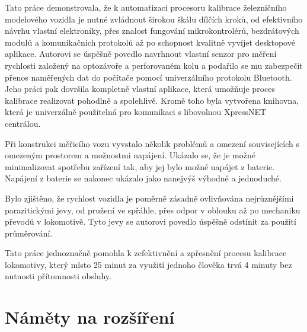 Tato práce demonstrovala, že k automatizaci procesoru kalibrace železničního
modelového vozidla je nutné zvládnout širokou škálu dílčích kroků, od
efektivního návrhu vlastní elektroniky, přes znalost fungování mikrokontrolérů,
bezdrátových modulů a komunikačních protokolů až po schopnost kvalitně vyvíjet
desktopové aplikace. Autorovi se úspěšně povedlo navrhnout vlastní senzor pro
měření rychlosti založený na optozávoře a perforovaném kolu a podařilo se mu
zabezpečit přenos naměřených dat do počítače pomocí univerzálního protokolu
Bluetooth. Jeho práci pak dovršila kompletně vlastní aplikace, která umožňuje
proces kalibrace realizovat pohodlně a spolehlivě. Kromě toho byla vytvořena
knihovna, která je univerzálně použitelná pro komunikaci s libovolnou XpressNET
centrálou.

Při konstrukci měřicího vozu vyvstalo několik problémů a omezení souvisejících
s omezeným prostorem a možnostmi napájení. Ukázalo se, že je možné minimalizovat
spotřebu zařízení tak, aby jej bylo možné napájet z baterie. Napájení z baterie
se nakonec ukázalo jako nanejvýš výhodné a jednoduché.

Bylo zjištěno, že rychlost vozidla je poměrně zásadně ovlivňována nejrůznějšími
parazitickými jevy, od pružení ve spřáhle, přes odpor v oblouku až po mechaniku
převodů v lokomotivě. Tyto jevy se autorovi povedlo úspěšně odstínit za použití
průměrování.

Tato práce jednoznačně pomohla k zefektivnění a zpřesnění procesu kalibrace
lokomotivy, který místo 25 minut za využití jednoho člověka trvá 4 minuty
bez nutnosti přítomnosti obsluhy.

\section{Náměty na rozšíření}


